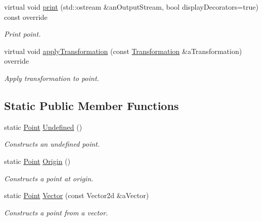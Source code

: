 \begin{DoxyCompactItemize}
virtual void \hyperlink{classostk_1_1math_1_1geom_1_1d2_1_1objects_1_1_point_abcc3a265107dcccfcfe9349a6be788e5}{print} (std\+::ostream \&an\+Output\+Stream, bool display\+Decorators=true) const override
\begin{DoxyCompactList}\small\item\em Print point. \end{DoxyCompactList}\item 
virtual void \hyperlink{classostk_1_1math_1_1geom_1_1d2_1_1objects_1_1_point_aa880df23e5ee93a60dad85597c600fb0}{apply\+Transformation} (const \hyperlink{classostk_1_1math_1_1geom_1_1d2_1_1_transformation}{Transformation} \&a\+Transformation) override
\begin{DoxyCompactList}\small\item\em Apply transformation to point. \end{DoxyCompactList}\end{DoxyCompactItemize}
\subsection*{Static Public Member Functions}
\begin{DoxyCompactItemize}
\item 
static \hyperlink{classostk_1_1math_1_1geom_1_1d2_1_1objects_1_1_point}{Point} \hyperlink{classostk_1_1math_1_1geom_1_1d2_1_1objects_1_1_point_a39c9ee703cfecf278ec2e9f3ffe4dac5}{Undefined} ()
\begin{DoxyCompactList}\small\item\em Constructs an undefined point. \end{DoxyCompactList}\item 
static \hyperlink{classostk_1_1math_1_1geom_1_1d2_1_1objects_1_1_point}{Point} \hyperlink{classostk_1_1math_1_1geom_1_1d2_1_1objects_1_1_point_a7b9fe974c947b8b1e1e2349c2a15a669}{Origin} ()
\begin{DoxyCompactList}\small\item\em Constructs a point at origin. \end{DoxyCompactList}\item 
static \hyperlink{classostk_1_1math_1_1geom_1_1d2_1_1objects_1_1_point}{Point} \hyperlink{classostk_1_1math_1_1geom_1_1d2_1_1objects_1_1_point_a6153f8ba851a8be99595d225632959af}{Vector} (const Vector2d \&a\+Vector)
\begin{DoxyCompactList}\small\item\em Constructs a point from a vector. \end{DoxyCompactList}\end{DoxyCompactItemize}
